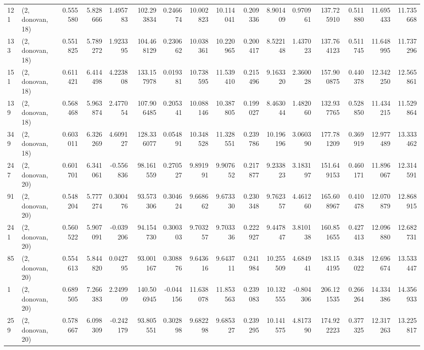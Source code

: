 \begin{tabular}{llrrrrrrrrrrrrrr}
121 &  (2, donovan, 18) &   0.555580 &   5.828666 &   1.495783 &   102.293834 &   0.246674 &  10.002823 &  10.114041 &  0.209336 &   8.901409 &   0.970961 &   137.725910 &  0.511880 &  11.695433 &  11.735668 \\
133 &  (2, donovan, 18) &   0.551825 &   5.789272 &   1.923395 &   104.468129 &   0.230662 &  10.038361 &  10.220965 &  0.200417 &   8.522148 &   1.437023 &   137.764123 &  0.511745 &  11.648995 &  11.737296 \\
151 &  (2, donovan, 18) &   0.611421 &   6.414498 &   4.223808 &   133.157978 &   0.019381 &  10.738595 &  11.539410 &  0.215496 &   9.163320 &   2.360028 &   157.900875 &  0.440378 &  12.342250 &  12.565861 \\
139 &  (2, donovan, 18) &   0.568468 &   5.963874 &   2.477054 &   107.906485 &   0.205341 &  10.088146 &  10.387805 &  0.199027 &   8.463044 &   1.482060 &   132.937765 &  0.528850 &  11.434215 &  11.529864 \\
349 &  (2, donovan, 18) &   0.603011 &   6.326269 &   4.609127 &   128.336077 &   0.054891 &  10.348528 &  11.328551 &  0.239786 &  10.196196 &   3.060390 &   177.781209 &  0.369919 &  12.977489 &  13.333462 \\
247 &  (2, donovan, 20) &   0.601701 &   6.341061 &  -0.556836 &    98.161559 &   0.270527 &   9.891991 &   9.907652 &  0.217877 &   9.233823 &   3.183197 &   151.649153 &  0.460171 &  11.896067 &  12.314591 \\
91  &  (2, donovan, 20) &   0.548204 &   5.777274 &   0.300476 &    93.573306 &   0.304624 &   9.668662 &   9.673330 &  0.230348 &   9.762357 &   4.461260 &   165.608967 &  0.410478 &  12.070879 &  12.868915 \\
241 &  (2, donovan, 20) &   0.560522 &   5.907091 &  -0.039206 &    94.154730 &   0.300303 &   9.703257 &   9.703336 &  0.222927 &   9.447847 &   3.810138 &   160.851655 &  0.427413 &  12.096880 &  12.682731 \\
85  &  (2, donovan, 20) &   0.554613 &   5.844820 &   0.042795 &    93.001167 &   0.308876 &   9.643616 &   9.643711 &  0.241984 &  10.255509 &   4.684941 &   183.154195 &  0.348022 &  12.696674 &  13.533447 \\
1   &  (2, donovan, 20) &   0.689505 &   7.266383 &   2.249909 &   140.506945 &  -0.044156 &  11.638078 &  11.853563 &  0.239083 &  10.132555 &  -0.804306 &   206.121535 &  0.266264 &  14.334386 &  14.356933 \\
259 &  (2, donovan, 20) &   0.578667 &   6.098309 &  -0.242179 &    93.805551 &   0.302898 &   9.682298 &   9.685327 &  0.239295 &  10.141575 &   4.817390 &   174.922223 &  0.377325 &  12.317263 &  13.225817 \\

\end{tabular}
